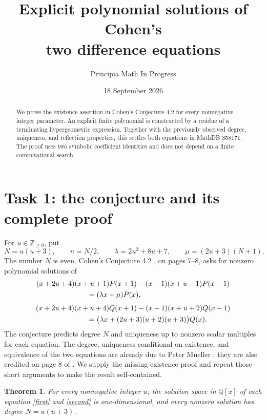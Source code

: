 \documentclass[11pt]{article}
\title{Explicit polynomial solutions of Cohen's\\two difference equations}
\author{Principia Math In Progress}
\date{18 September 2026}
\newtheorem{theorem}{Theorem}
\begin{document}
\maketitle
\begin{abstract}
We prove the existence assertion in Cohen's Conjecture 4.2 for every
nonnegative integer parameter. An explicit finite polynomial is
constructed by a residue of a terminating hypergeometric expression.
Together with the previously observed degree, uniqueness, and reflection
properties, this settles both equations in MathDB 358171.
The proof uses two symbolic coefficient identities and does not depend
on a finite computational search.
\end{abstract}

\section*{Task 1: the conjecture and its complete proof}
For \(u\in\mathbb Z_{\ge0}\), put
\[
 N=u(u+3),\qquad n=N/2,\qquad
 \lambda=2u^2+8u+7,\qquad \mu=(2u+3)(N+1).
\]
The number \(N\) is even. Cohen's Conjecture 4.2 \cite{C},
on pages 7--8, asks for nonzero polynomial solutions of
\begin{equation}\label{first}
\begin{split}
 &(x+2u+4)(x+u+1)P(x+1)-(x-1)(x+u-1)P(x-1)\\
 &\hspace{25mm}=(\lambda x+\mu)P(x),
\end{split}
\end{equation}
\begin{equation}\label{second}
\begin{split}
 &(x+2u+4)(x+u+4)Q(x+1)-(x-1)(x+u+2)Q(x-1)\\
 &\hspace{25mm}=\bigl(\lambda x+(2u+3)(u+2)(u+3)\bigr)Q(x).
\end{split}
\end{equation}
The conjecture predicts degree \(N\) and uniqueness up to nonzero
scalar multiples for each equation. The degree, uniqueness conditional
on existence, and equivalence of the two equations are already due to
Peter Mueller \cite{M}; they are also credited on page 8 of \cite{C}.
We supply the missing existence proof and repeat those short arguments
to make the result self-contained.

\begin{theorem}\label{main}
For every nonnegative integer \(u\), the solution space in
\(\mathbb Q[x]\) of each equation \eqref{first} and \eqref{second}
is one-dimensional, and every nonzero solution has degree \(N=u(u+3)\).
\end{theorem}
\end{document}
